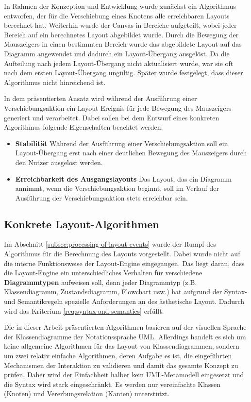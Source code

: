 In Rahmen der Konzeption und Entwicklung wurde zunächst ein Algorithmus entworfen, der für die Verschiebung eines Knotens alle erreichbaren Layouts berechnet hat. Weiterhin wurde der Canvas in Bereiche aufgeteilt, wobei jeder Bereich auf ein berechnetes Layout abgebildet wurde. Durch die Bewegung der Mauszeigers in einen bestimmten Bereich wurde das abgebildete Layout auf das Diagramm angewendet und dadurch ein Layout-Übergang ausgelöst. Da die Aufteilung nach jedem Layout-Übergang nicht aktualisiert wurde, war sie oft nach dem ersten Layout-Übergang ungültig. Später wurde festgelegt, dass dieser Algorithmus nicht hinreichend ist.

In dem präsentierten Ansatz wird während der Ausführung einer Verschiebungsaktion ein Layout-Ereignis für jede Bewegung des Mauszeigers generiert und verarbeitet. Dabei sollen bei dem Entwurf eines konkreten Algorithmus folgende Eigenschaften beachtet werden:

\begin{itemize}
    \item \textbf{Stabilität} Während der Ausführung einer Verschiebungsaktion soll ein Layout-Übergang erst nach einer deutlichen Bewegung des Mauszeigers durch den Nutzer ausgelöst werden.
    \item \textbf{Erreichbarkeit des Ausgangslayouts} Das Layout, das ein Diagramm annimmt, wenn die Verschiebungsaktion beginnt, soll im Verlauf der Ausführung der Verschiebungsaktion stets erreichbar sein.
\end{itemize}

\subsection{Konkrete Layout-Algorithmen}
\label{subsec:concrete-layout-algorithms}

Im Abschnitt \ref{subsec:processing-of-layout-events} wurde der Rumpf des Algorithmus für die Berechnung des Layouts vorgestellt. Dabei wurde nicht auf die interne Funktionsweise der Layout-Engine eingegangen. Das liegt daran, dass die Layout-Engine ein unterschiedliches Verhalten für verschiedene \textbf{Diagrammtypen} aufweisen soll, denn jeder Diagrammtyp (z.B. Klassendiagramm, Zustandsdiagramm, Flowchart usw.) hat aufgrund der Syntax- und Semantikregeln spezielle Anforderungen an des ästhetische Layout. Dadurch wird das Kriterium \ref{req:syntax-and-semantics} erfüllt.

Die in dieser Arbeit präsentierten Algorithmen basieren auf der visuellen Sprache der Klassendiagramme der Notationssprache UML. Allerdings handelt es sich um keine allgemeine Algorithmen für das Layout von Klassendiagrammen, sondern um zwei relativ einfache Algorithmen, deren Aufgabe es ist, die eingeführten Mechanismen der Interaktion zu validieren und damit das gesamte Konzept zu prüfen. Daher wird der Einfachheit halber kein UML-Metamodell eingesetzt und die Syntax wird stark eingeschränkt. Es werden nur vereinfachte Klassen (Knoten) und Vererbungsrelation (Kanten) unterstützt.

